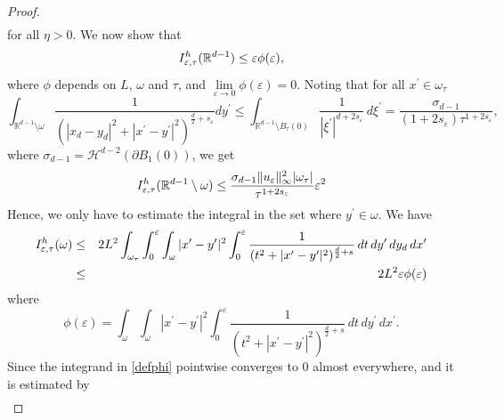 \documentclass[10pt,a4paper]{amsart}
\def\e{\varepsilon}
\begin{document}
\begin{proof}
\begin{eqnarray}
\end{eqnarray}
for all $\eta>0$. 
We now show that 
\begin{equation}\label{stima-or}
I_{\e,\tau}^{\rm h}(\mathbb R^{d-1})\leq\e\phi(\e),
\end{equation}
where $\phi$ depends on $L$, $\omega$ and $\tau$, and $\lim\limits_{\e\to 0}\phi(\e)=0$.
Noting that for all $x^\prime\in\omega_\tau$ 
\begin{equation*}
\int_{\mathbb R^{d-1}\setminus\omega} \frac{1}{(|x_d-y_d|^2+|x^\prime-y^\prime|^2)^{\frac{d}{2}+s_\e}} dy^\prime
\leq\int_{\mathbb R^{d-1}\setminus B_\tau(0)} \frac{1}{|\xi^\prime|^{d+2s_\e}}\, d\xi^\prime
=\frac{\sigma_{d-1}}{(1+2s_\e)\tau^{1+2s_\e}}, 
\end{equation*}
where $\sigma_{d-1}=\mathcal H^{d-2}(\partial B_1(0))$, 
we get 
\begin{equation}
I^{\rm h}_{\e,\tau}(\mathbb R^{d-1}\setminus \omega)
\leq \frac{\sigma_{d-1}\|u_\e\|^2_\infty |\omega_\tau|}{\tau^{1+2s_\e}}\e^2\label{st1}\\
\end{equation}
Hence, we only have to estimate the integral in the set where $y^\prime\in\omega$. 
We have 
\begin{eqnarray*}
I^{\rm h}_{\e,\tau}(\omega)
&\leq& 
2L^2\int_{\omega_\tau}\int_0^\e\int_{\omega}|x^\prime-y^\prime|^2\int_0^\e\frac{1}{(t^2+|x^\prime-y^\prime|^2)^{\frac{d}{2}+s}}\, dt\, dy^\prime\, dy_d\, dx^\prime\\
&\leq& 
2L^2\e\phi(\e)
\end{eqnarray*}
where 
\begin{equation}\label{defphi}\phi(\e)=
\int_{\omega}\int_{\omega}|x^\prime-y^\prime|^2
\int_0^\e\frac{1}{(t^2+|x^\prime-y^\prime|^2)^{\frac{d}{2}+s}}\, dt
\, dy^\prime\, dx^\prime.
\end{equation}
Since the integrand in \eqref{defphi} pointwise converges to $0$ almost everywhere, and it is estimated by 
\begin{eqnarray*}

\end{eqnarray*}
\end{proof}
\end{document}
